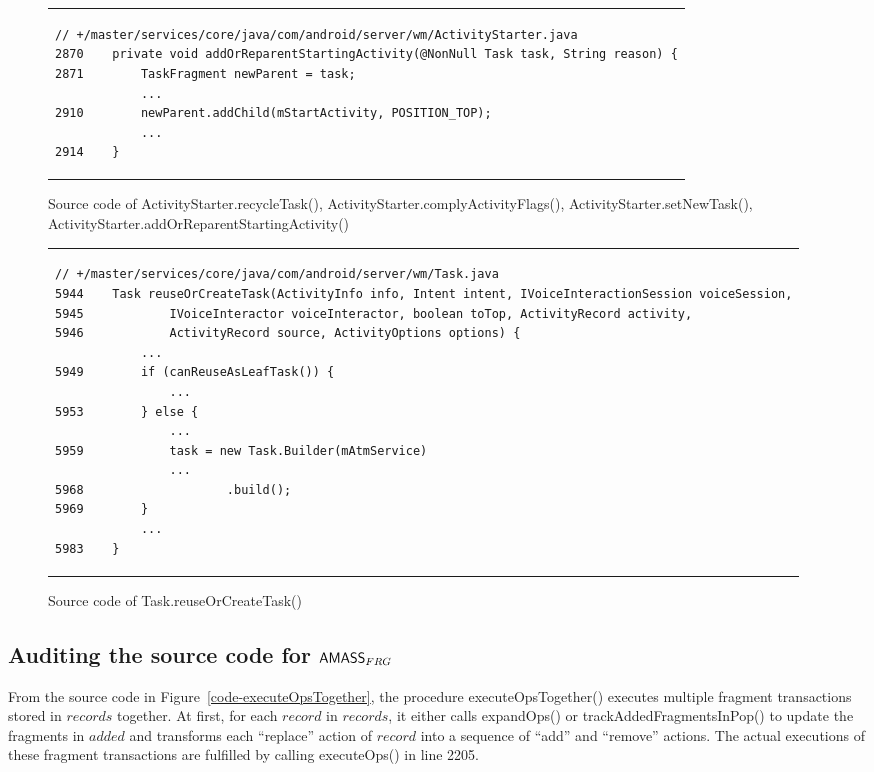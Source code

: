 \begin{figure}[htbp]
\begin{tabular*}{\linewidth}{l}
\begin{lstlisting}
// +/master/services/core/java/com/android/server/wm/ActivityStarter.java
2870    private void addOrReparentStartingActivity(@NonNull Task task, String reason) {
2871        TaskFragment newParent = task;
            ...
2910        newParent.addChild(mStartActivity, POSITION_TOP);
            ...
2914    }
\end{lstlisting}
\end{tabular*}
\caption{Source code of ActivityStarter.recycleTask(), ActivityStarter.complyActivityFlags(), ActivityStarter.setNewTask(), ActivityStarter.addOrReparentStartingActivity()} 
\label{code-recycle-set-NewTask}
\end{figure}


\begin{figure}[htbp]
\centering
\begin{tabular*}{\linewidth}{l}
\begin{lstlisting}
// +/master/services/core/java/com/android/server/wm/Task.java
5944    Task reuseOrCreateTask(ActivityInfo info, Intent intent, IVoiceInteractionSession voiceSession,
5945            IVoiceInteractor voiceInteractor, boolean toTop, ActivityRecord activity,
5946            ActivityRecord source, ActivityOptions options) {
            ...
5949        if (canReuseAsLeafTask()) {
                ...
5953        } else {
                ...
5959            task = new Task.Builder(mAtmService)
                ...
5968                    .build();
5969        }
            ...
5983    }
\end{lstlisting}
\end{tabular*}
\caption{Source code of Task.reuseOrCreateTask()} 
\label{code-reuseOrCreateTask}
\end{figure}


\subsection{Auditing the source code for $\textsf{AMASS}_{FRG}$}\label{app:code-audit-fomass}



From the source code in Figure~\ref{code-executeOpsTogether}, the procedure executeOpsTogether() executes multiple fragment transactions stored in $records$ together. At first, for each $record$ in $records$, it either calls expandOps() or trackAddedFragmentsInPop() to update the fragments in $added$ and transforms each ``replace'' action of $record$ into a sequence of ``add'' and ``remove'' actions. The actual executions of these fragment transactions are fulfilled by calling executeOps() in line 2205. 

